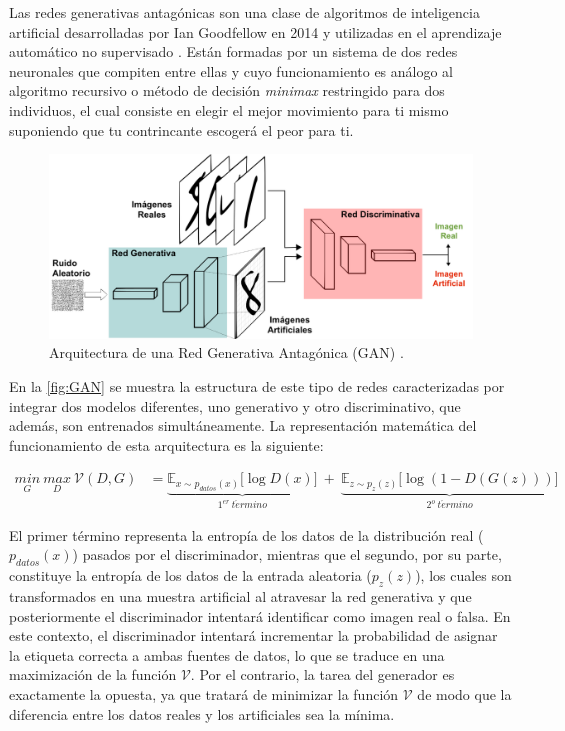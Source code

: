 Las redes generativas antagónicas son una clase de algoritmos de inteligencia artificial desarrolladas por Ian Goodfellow en 2014 y utilizadas en el aprendizaje automático no supervisado \cite{GAN}. Están formadas por un sistema de dos redes neuronales que compiten entre ellas y cuyo funcionamiento es análogo al algoritmo recursivo o método de decisión \textit{minimax} restringido para dos individuos, el cual consiste en elegir el mejor movimiento para ti mismo suponiendo que tu contrincante escogerá el peor para ti. 

\begin{figure}
    \centering
    \includegraphics[width=\textwidth]{Images/GAN.png}
    \caption{Arquitectura de una Red Generativa Antagónica (GAN) \cite{img:GAN}.}
    \label{fig:GAN}
\end{figure}

En la \autoref{fig:GAN} se muestra la estructura de este tipo de redes caracterizadas por integrar dos modelos diferentes, uno generativo y otro discriminativo, que además, son entrenados simultáneamente. La representación matemática del funcionamiento de esta arquitectura es la siguiente:

\begin{align}
    \underset{G}{min} \ \underset{D}{max} \ \mathcal{V}(D, G) &= \underbrace{\mathbb{E}_{x\sim p_{datos}(x)} \big[\log D(x)\big]}_{1^{er} \ t\acute{e}rmino} \ + \ \underbrace{\mathbb{E}_{z\sim p_{z}(z)} \big[\log (1- D(G(z)))\big]}_{2^{o} \ t\acute{e}rmino}
\end{align}

El primer término representa la entropía de los datos de la distribución real ($p_{datos}(x)$) pasados por el discriminador, mientras que el segundo, por su parte, constituye la entropía de los datos de la entrada aleatoria ($p_z(z)$), los cuales son transformados en una muestra artificial al atravesar la red generativa y que posteriormente el discriminador intentará identificar como imagen real o falsa. En este contexto, el discriminador intentará incrementar la probabilidad de asignar la etiqueta correcta a ambas fuentes de datos, lo que se traduce en una maximización de la función $\mathcal{V}$. Por el contrario, la tarea del generador es exactamente la opuesta, ya que tratará de minimizar la función $\mathcal{V}$ de modo que la diferencia entre los datos reales y los artificiales sea la mínima.

